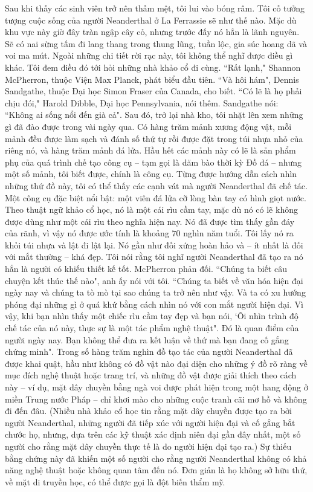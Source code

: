 \begin{multicols}{2}
	\vskip 0.1cm
	Sau khi thấy các sinh viên trở nên thấm mệt, tôi lui vào bóng râm. Tôi cố tưởng tượng cuộc sống của người Neanderthal ở La Ferrassie sẽ như thế nào. Mặc dù khu vực này giờ đây tràn ngập cây cỏ, nhưng trước đấy nó hẳn là lãnh nguyên. Sẽ có nai sừng tấm đi lang thang trong thung lũng, tuần lộc, gia súc hoang dã và voi ma mút. Ngoài những chi tiết rời rạc này, tôi không thể nghĩ được điều gì khác. Tôi đem điều đó tới hỏi những nhà khảo cổ đi cùng.
	\vskip 0.1cm
	``Rất lạnh," Shannon McPherron, thuộc Viện Max Planck, phát biểu đầu tiên.
	\vskip 0.1cm
	``Và hôi hám", Dennis Sandgathe, thuộc Đại học Simon Fraser của Canada, cho biết.
	\vskip 0.1cm
	``Có lẽ là họ phải chịu đói," Harold Dibble, Đại học Pennsylvania, nói thêm.
	\vskip 0.1cm
	Sandgathe nói: ``Không ai sống nổi đến già cả".
	\vskip 0.1cm
	Sau đó, trở lại nhà kho, tôi nhặt lên xem những gì đã đào được trong vài ngày qua. Có hàng trăm mảnh xương động vật, mỗi mảnh đều được làm sạch và đánh số thứ tự rồi được đặt trong túi nhựa nhỏ của riêng nó, và hàng trăm mảnh đá lửa. Hầu hết các mảnh này có lẽ là sản phẩm phụ của quá trình chế tạo công cụ -- tạm gọi là dăm bào thời kỳ Đồ đá -- nhưng một số mảnh, tôi biết được, chính là công cụ. Từng được hướng dẫn cách nhìn những thứ đồ này, tôi có thể thấy các cạnh vát mà người Neanderthal đã chế tác. Một công cụ đặc biệt nổi bật: một viên đá lửa cỡ lòng bàn tay có hình giọt nước. Theo thuật ngữ khảo cổ học, nó là một cái rìu cầm tay, mặc dù nó có lẽ không được dùng như một cái rìu theo nghĩa hiện nay. Nó đã được tìm thấy gần đáy của rãnh, vì vậy nó được ước tính là khoảng $70$ nghìn năm tuổi. Tôi lấy nó ra khỏi túi nhựa và lật đi lật lại. Nó gần như đối xứng hoàn hảo và -- ít nhất là đối với mắt thường -- khá đẹp. Tôi nói rằng tôi nghĩ người Neanderthal đã tạo ra nó hẳn là người có khiếu thiết kế tốt. McPherron phản đối.
	\vskip 0.1cm
	``Chúng ta biết câu chuyện kết thúc thế nào", anh ấy nói với tôi. ``Chúng ta biết về văn hóa hiện đại ngày nay và chúng ta tò mò tại sao chúng ta trở nên như vậy. Và ta có xu hướng phóng đại những gì ở quá khứ bằng cách nhìn nó với con mắt người hiện đại. Vì vậy, khi bạn nhìn thấy một chiếc rìu cầm tay đẹp và bạn nói, ‘Ôi nhìn trình độ chế tác của nó này, thực sự là một tác phẩm nghệ thuật". Đó là quan điểm của người ngày nay. Bạn không thể đưa ra kết luận về thứ mà bạn đang cố gắng chứng minh".
	\vskip 0.1cm
	Trong số hàng trăm nghìn đồ tạo tác của người Neanderthal đã được khai quật, hầu như không có đồ vật nào đại diện cho những ý đồ rõ ràng về mục đích nghệ thuật hoặc trang trí, và những đồ vật được giải thích theo cách này -- ví dụ, mặt dây chuyền bằng ngà voi được phát hiện trong một hang động ở miền Trung nước Pháp -- chỉ khơi mào cho những cuộc tranh cãi mơ hồ và không đi đến đâu. (Nhiều nhà khảo cổ học tin rằng mặt dây chuyền được tạo ra bởi người Neanderthal, những người đã tiếp xúc với người hiện đại và cố gắng bắt chước họ, nhưng, dựa trên các kỹ thuật xác định niên đại gần đây nhất, một số người cho rằng mặt dây chuyền thực tế là do người hiện đại tạo ra.) Sự thiếu bằng chứng này đã khiến một số người cho rằng người Neanderthal không có khả năng nghệ thuật hoặc không quan tâm đến nó. Đơn giản là họ không sở hữu thứ, về mặt di truyền học, có thể được gọi là đột biến thẩm mỹ.

\end{multicols}
